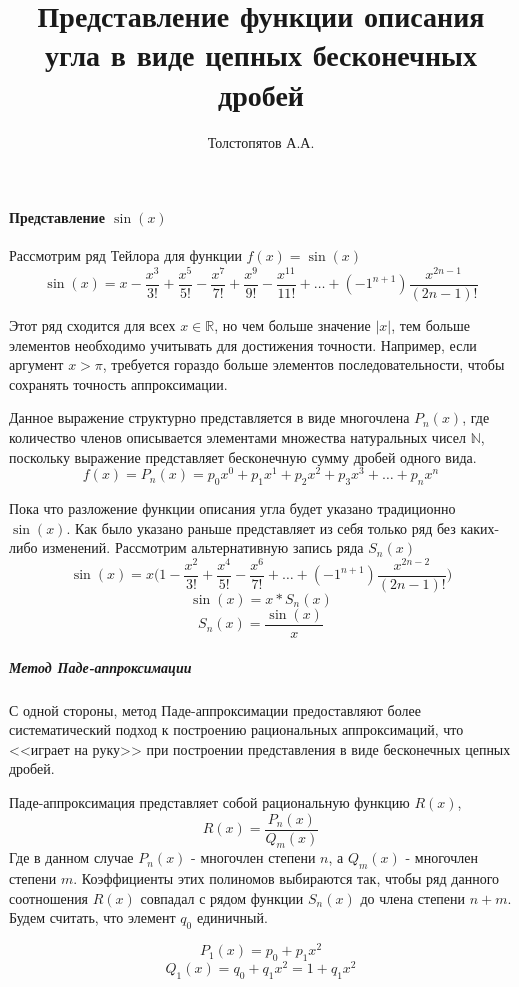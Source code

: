 \documentclass{article}
\title{Представление функции описания угла в виде цепных бесконечных дробей}
\author{Толстопятов А.А.}
\begin{document}
    \maketitle    
    \paragraph*{Представление $\sin(x)$}
    Рассмотрим ряд Тейлора для функции $f(x) = \sin(x)$
    $$\sin(x) = x - \frac{x^3}{3!} + \frac{x^5}{5!} - \frac{x^7}{7!} + \frac{x^9}{9!} - \frac{x^{11}}{11!} + \dots + (-1^{n+1})\frac{x^{2n-1}}{(2n-1)!}$$
    
    Этот ряд сходится для всех $x\in\mathbb{R}$, но чем больше значение $|x|$,
    тем больше элементов необходимо учитывать для достижения точности.
    Например, если аргумент $x>\pi$, требуется гораздо больше 
    элементов последовательности, чтобы сохранять точность аппроксимации.
    
    Данное выражение структурно представляется в виде 
    многочлена $P_n(x)$, где количество членов описывается 
    элементами множества натуральных чисел $\mathbb{N}$, 
    поскольку выражение представляет бесконечную сумму дробей одного вида.
    $$f(x) = P_n(x) = p_0x^0 + p_1x^1 + p_2x^2 + p_3x^3 + \dots + p_nx^n$$

    Пока что разложение функции описания угла будет указано традиционно $\sin(x)$.
    Как было указано раньше представляет из себя только ряд без каких-либо изменений.
    Рассмотрим альтернативную запись ряда $S_n(x)$
    $$\sin(x) = x\Bigg(1 - \frac{x^2}{3!} + \frac{x^4}{5!} - \frac{x^6}{7!} + \dots + (-1^{n+1})\frac{x^{2n-2}}{(2n-1)!}\Bigg)$$
    $$\sin(x) = x * S_n(x)$$
    $$S_n(x) = \frac{\sin(x)}{x}$$

    \subparagraph{Метод Паде-аппроксимации}
    С одной стороны, 
    метод Паде-аппроксимации предоставляют 
    более систематический подход к построению рациональных аппроксимаций,
    что <<играет на руку>> при построении представления в виде бесконечных
    цепных дробей. 
    
    Паде-аппроксимация представляет собой рациональную функцию 
    $R(x)$,
    $$R(x) = \frac{P_n(x)}{Q_m(x)}$$
    Где в данном случае $P_n(x)$ - многочлен степени $n$, а $Q_m(x)$ - многочлен степени $m$. 
    Коэффициенты этих полиномов выбираются так, 
    чтобы ряд данного соотношения $R(x)$ совпадал с рядом функции
    $S_n(x)$ до члена степени $n+m$. Будем считать, что элемент $q_0$ единичный.

    $$P_1(x) = p_0 + p_1x^2$$
    $$Q_1(x) = q_0 + q_1x^2 = 1 + q_1x^2$$
\end{document}
